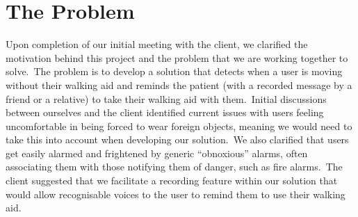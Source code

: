     \section{The Problem}
        Upon completion of our initial meeting with the client, we clarified the motivation behind this project and the
        problem that we are working together to solve.\ The problem is to develop a solution that detects when a
        user is moving without their walking aid and reminds the patient (with a recorded message by a
        friend or a relative) to take their walking aid with them.\ Initial discussions between ourselves and the client
        identified current issues with users feeling uncomfortable in being forced to wear foreign objects,
        meaning we would need to take this into account when developing our solution.\ We also clarified that users get easily alarmed and frightened by generic “obnoxious” alarms, often associating them with those
        notifying them of danger, such as fire alarms.\ The client suggested that we facilitate a recording feature
        within our solution that would allow recognisable voices to the user to remind them to use their
        walking aid.

